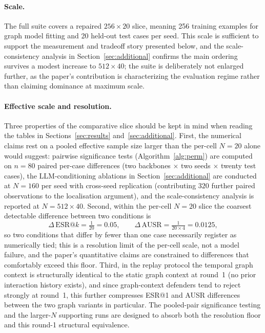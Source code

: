 \documentclass[10pt,letterpaper]{article}
\begin{document}
\paragraph{Scale.}
The full suite covers a repaired $256 \times 20$ slice, meaning 256 training examples for graph model fitting and 20 held-out test cases per seed. This scale is sufficient to support the measurement and tradeoff story presented below, and the scale-consistency analysis in Section~\ref{sec:additional} confirms the main ordering survives a modest increase to $512 \times 40$; the suite is deliberately not enlarged further, as the paper's contribution is characterizing the evaluation regime rather than claiming dominance at maximum scale.

\paragraph{Effective scale and resolution.}
Three properties of the comparative slice should be kept in mind when reading the tables in Sections~\ref{sec:results} and~\ref{sec:additional}. First, the numerical claims rest on a pooled effective sample size larger than the per-cell $N=20$ alone would suggest: pairwise significance tests (Algorithm~\ref{alg:perm}) are computed on $n=80$ paired per-case differences (two backbones $\times$ two seeds $\times$ twenty test cases), the LLM-conditioning ablations in Section~\ref{sec:additional} are conducted at $N=160$ per seed with cross-seed replication (contributing $320$ further paired observations to the localisation argument), and the scale-consistency analysis is reported at $N=512 \times 40$. Second, within the per-cell $N=20$ slice the coarsest detectable difference between two conditions is
\[
\Delta\,\text{ESR}@k = \tfrac{1}{20} = 0.05, \qquad \Delta\,\text{AUSR} = \tfrac{1}{20 \times 4} = 0.0125,
\]
so two conditions that differ by fewer than one case necessarily register as numerically tied; this is a resolution limit of the per-cell scale, not a model failure, and the paper's quantitative claims are constrained to differences that comfortably exceed this floor. Third, in the replay protocol the temporal graph context is structurally identical to the static graph context at round~1 (no prior interaction history exists), and since graph-context defenders tend to reject strongly at round~1, this further compresses ESR@1 and AUSR differences between the two graph variants in particular. The pooled-pair significance testing and the larger-$N$ supporting runs are designed to absorb both the resolution floor and this round-1 structural equivalence.
\end{document}
